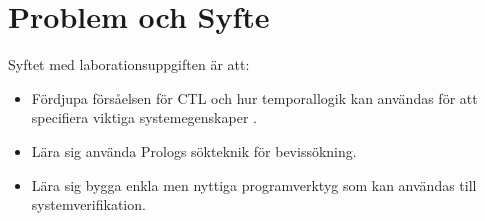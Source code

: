 \section{Problem och Syfte}
Syftet med laborationsuppgiften är att:

\begin{itemize}

\item Fördjupa försåelsen för CTL och hur temporallogik kan användas för att specifiera viktiga systemegenskaper \cite{huth}.

\item Lära sig använda Prologs sökteknik för bevissökning.

\item Lära sig bygga enkla men nyttiga programverktyg som kan användas till systemverifikation.

\end{itemize}